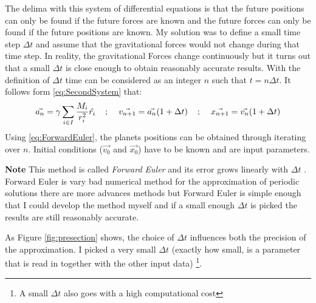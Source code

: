 \documentclass[a4paper,onesided,10pt]{article}
\begin{document}
The delima with this system of differential equations is that the future positions can only be found if the future forces are known and the future forces can only be found if the future positions are known. My solution was to define a small time step $\Delta t$ and assume that the gravitational forces would not change during that time step. In reality, the gravitational Forces change continuously but it turns out that a small $\Delta t$ is close enough to obtain reasonably accurate results. With the definition of $\Delta t$ time can be considered as an integer $n$ such that $t = n \Delta t$. It follows form \ref{eq:SecondSystem} that:
\begin{equation}
\vec{a_n} = \gamma \sum_{i \in I}{\frac{M_i}{r_i^2}} \hat{r_i}  
\hspace{4mm} ; \hspace{4mm}  
\vec{v_{n+1}} = \vec{a_n} (1+\Delta t)   
\hspace{4mm} ; \hspace{4mm}  
\vec{x_{n+1}} = \vec{v_n} (1+\Delta t)
\label{eq:ForwardEuler}
\end{equation}
Using \ref{eq:ForwardEuler}, the planets positions can be obtained through iterating over $n$. Initial conditions ($\vec{v_0}$ and $\vec{x_0}$) have to be known and are input parameters.

\textbf{Note} This method is called \textit{Forward Euler} and its error grows linearly with $\Delta t$ \cite{NSDE}. Forward Euler is vary bad numerical method for the approximation of periodic solutions there are more advances methods \cite{NSDE} but Forward Euler is simple enough that I could develop the method myself and if a small enough $\Delta t$ is picked the results are still reasonably accurate.

As Figure \ref{fig:presection} shows, the choice of $\Delta t$ influences both the precision of the approximation. I picked a very small $\Delta t$ (exactly how small, is a parameter that is read in together with the other input data) \footnote{A small $\Delta t$ also goes with a high computational cost}.
\end{document}
